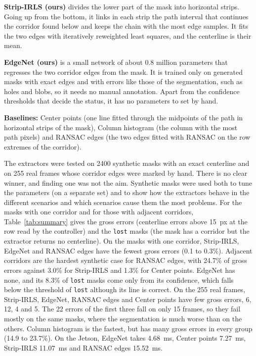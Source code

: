\documentclass[10pt,a4paper]{article}
\begin{document}
\textbf{Strip-IRLS (ours)} divides the lower part of the mask into horizontal strips. Going up from the bottom, it links in each strip the path interval that continues the corridor found below and keeps the chain with the most edge samples. It fits the two edges with iteratively reweighted least squares, and the centerline is their mean.

\textbf{EdgeNet (ours)} is a small network of about 0.8 million parameters that regresses the two corridor edges from the mask. It is trained only on generated masks with exact edges and with errors like those of the segmentation, such as holes and blobs, so it needs no manual annotation. Apart from the confidence thresholds that decide the status, it has no parameters to set by hand.

\textbf{Baselines:} Center points (one line fitted through the midpoints of the path in horizontal strips of the mask), Column histogram (the column with the most path pixels) and RANSAC edges (the two edges fitted with RANSAC on the row extremes of the corridor).


The extractors were tested on 2400 synthetic masks with an exact centerline and on 255 real frames whose corridor edges were marked by hand. There is no clear winner, and finding one was not the aim. Synthetic masks were used both to tune the parameters (on a separate set) and to show how the extractors behave in the different scenarios and which scenarios cause them the most problems. For the masks with one corridor and for those with adjacent corridors, Table~\ref{tab:summary} gives the gross errors (centerline errors above 15~px at the row read by the controller) and the \texttt{lost} masks (the mask has a corridor but the extractor returns no centerline). On the masks with one corridor, Strip-IRLS, EdgeNet and RANSAC edges have the fewest gross errors (0.1 to 0.3\%). Adjacent corridors are the hardest synthetic case for RANSAC edges, with 24.7\% of gross errors against 3.0\% for Strip-IRLS and 1.3\% for Center points. EdgeNet has none, and its 8.3\% of \texttt{lost} masks come only from its confidence, which falls below the threshold of \texttt{lost} although its line is correct. On the 255 real frames, Strip-IRLS, EdgeNet, RANSAC edges and Center points have few gross errors, 6, 12, 4 and 5. The 22 errors of the first three fall on only 15 frames, so they fail mostly on the same masks, where the segmentation is much worse than on the others. Column histogram is the fastest, but has many gross errors in every group (14.9 to 23.7\%). On the Jetson, EdgeNet takes 4.68~ms, Center points 7.27~ms, Strip-IRLS 11.07~ms and RANSAC edges 15.52~ms.
\end{document}
